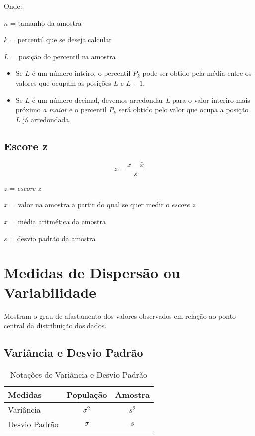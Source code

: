 Onde:

\(n\) = tamanho da amostra

\(k\) = percentil que se deseja calcular	

\(L\) = posição do percentil na amostra

\begin{itemize}
    \item Se \(L\) é um número inteiro, o percentil \(P_k\) pode ser obtido pela média 			entre os valores que ocupam as posições \(L\) e \(L+1\).
    \item Se \(L\) é um número decimal, devemos arredondar \(L\) para o valor interiro 			mais próximo \emph{a maior} e o percentil \(P_k\) será obtido pelo valor que ocupa a 		posição \(L\) já arredondada.      
\end{itemize}

\subsection{Escore z}

\[z = \frac{x-\bar{x}}{s}\]

\(z\) = \emph{escore z}

\(x\) = valor na amostra a partir do qual se quer medir o \emph{escore z}

\(\bar{x}\) = média aritmética da amostra

\(s\) = desvio padrão da amostra

\section{Medidas de Dispersão ou Variabilidade}

Mostram o grau de afastamento dos valores observados em relação ao ponto central da distribuição dos dados.

\subsection{Variância e Desvio Padrão}

\begin{table}[h]
	\centering	
	\caption{Notações de Variância e Desvio Padrão}
	\begin{tabular}{l|cc} 
		Medidas 		& População 	& Amostra 		\\
		\hline
		Variância		& \(\sigma^2 \)	& \(s^2\)	\\
		Desvio Padrão	& \(\sigma \)	& \(s\)
	\end{tabular}
\end{table}

